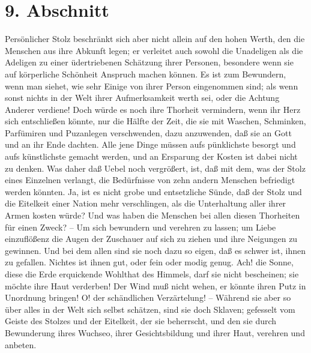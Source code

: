 \section{9. Abschnitt} \label{kap11_ab9}

Persönlicher Stolz beschränkt sich aber nicht allein auf den hohen Werth, den
die Menschen aus ihre Abkunft legen; er verleitet auch sowohl die Unadeligen als
die Adeligen zu einer üdertriebenen Schätzung ihrer Personen, besondere wenn sie
auf körperliche Schönheit Anspruch machen können. Es ist zum Bewundern, wenn man
siehet, wie sehr Einige von ihrer Person eingenommen sind; als wenn sonst nichts
in der Welt ihrer Aufmerksamkeit werth sei, oder die Achtung Anderer verdiene!
Doch würde es noch ihre Thorheit vermindern, wenn ihr Herz sich entschließen
könnte, nur die Hälfte der Zeit, die sie mit Waschen, Schminken, Parfümiren und
Puzanlegen verschwenden, dazu anzuwenden, daß sie an Gott und an ihr Ende
dachten. Alle jene Dinge müssen aufs pünklichste besorgt und aufs künstlichste
gemacht werden, und an Ersparung der Kosten ist dabei nicht zu denken. Was daher
daß Uebel noch vergrößert, ist, daß mit dem, was der Stolz eines Einzelnen
verlangt, die Bedürfnisse von zehn andern Menschen befriedigt werden könnten.
Ja, ist es nicht grobe und entsetzliche Sünde, daß der Stolz und die Eitelkeit
einer Nation mehr verschlingen, als die Unterhaltung aller ihrer Armen kosten
würde? Und was haben die Menschen bei allen diesen Thorheiten für einen Zweck?
-- Um sich bewundern und verehren zu lassen; um Liebe einzuflößenz die Augen der
Zuschauer auf sich zu ziehen und ihre Neigungen zu gewinnen. Und bei dem allen
sind sie noch dazu so eigen, daß es schwer ist, ihnen zu gefallen. Nichtes ist
ihnen gut, oder fein oder modig genug. Ach! die Sonne, diese die Erde
erquickende Wohlthat des Himmels, darf sie nicht bescheinen; sie möchte ihre
Haut verderben! Der Wind muß nicht wehen, er könnte ihren Putz in Unordnung
bringen! O! der schändlichen Verzärtelung! -- Während sie aber so über alles in
der Welt sich selbst schätzen, sind sie doch Sklaven; gefesselt vom Geiste des
Stolzes und der Eitelkeit, der sie beherrscht, und den sie durch Bewunderung
ihres Wuchseo, ihrer Gesichtsbildung und ihrer Haut, verehren und anbeten.

